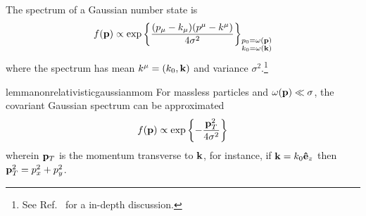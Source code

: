\begin{definition}
	The spectrum of a Gaussian number state is
	\begin{equation}
		f(\vb{p})
		\propto
		\exp\left\{
			\frac{(p_\mu-k_\mu)(p^\mu-k^\mu)}{4\sigma^2}
		\right\}_{\substack{p_0=\omega(\vb{p})\\k_0=\omega(\vb{k})}}
		\label{eq:covariant_gaussian_spectrum}
	\end{equation}
	where the spectrum has mean $k^\mu=(k_0,\vb{k})$ and variance $\sigma^2$.\footnote{See Ref.~\cite{Naumov2013,Naumov2009} for a in-depth discussion.}
\end{definition}
\begin{restatable}{lemma}{nonrelativisticgaussianmom}\label{thm:non_relativistic_gaussian_momentum}
	For massless particles and $\omega(\vb{p})\ll\sigma$, the covariant Gaussian spectrum can be approximated
	\begin{equation}
		f(\vb{p})
		\propto
		\exp\left\{
			-
			\frac{
				\vb{p}_T^2
			}{4\sigma^2}
		\right\}
	\end{equation}
	wherein $\vb{p}_T$ is the momentum transverse to $\vb{k}$, for instance, if $\vb{k}=k_0\vu{e}_z$ then $\vb{p}_T^2=p_x^2+p_y^2$.
\end{restatable}